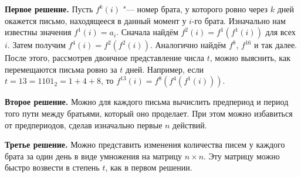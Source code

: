 \textbf{Первое решение.}
Пусть $f^k (i)$ "--- номер брата, у которого ровно через $k$ дней
окажется письмо, находящееся в данный момент у $i$-го брата.
Изначально нам известны значения $f^1 (i) = a_i$.
Сначала найдём $f^2 (i) = f^1 (f^1 (i))$ для всех $i$.
Затем получим $f^4 (i) = f^2 (f^2 (i))$.
Аналогично найдём $f^8$, $f^{16}$ и так далее.
После этого, рассмотрев двоичное представление числа $t$,
можно выяснить, как перемещаются письма ровно за $t$ дней.
Например, если $t = 13 = 1101_2 = 1 + 4 + 8$,
то $f^{13} (i) = f^{8} (f^{4} (f^{1} (i)))$.

\textbf{Второе решение.}
Можно для каждого письма вычислить предпериод и период
того пути между братьями, который оно проделает.
При этом можно избавиться от предпериодов,
сделав изначально первые $n$ действий.

\textbf{Третье решение.}
Можно представить изменения количества писем у каждого брата
за один день в виде умножения на матрицу $n \times n$.
Эту матрицу можно быстро возвести в степень $t$, как в первом решении.
